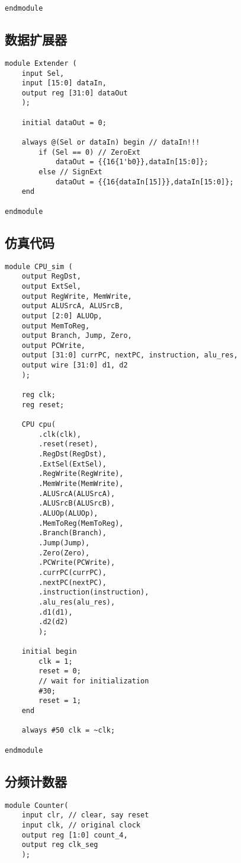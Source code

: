 \begin{multicols}{2}
\begin{lstlisting}
endmodule
\end{lstlisting}

\subsection{数据扩展器}
\begin{lstlisting}
module Extender (
	input Sel,
	input [15:0] dataIn,
	output reg [31:0] dataOut
	);

	initial dataOut = 0;

	always @(Sel or dataIn) begin // dataIn!!!
		if (Sel == 0) // ZeroExt
			dataOut = {{16{1'b0}},dataIn[15:0]};
		else // SignExt
			dataOut = {{16{dataIn[15]}},dataIn[15:0]};
	end

endmodule
\end{lstlisting}

\subsection{仿真代码}
\begin{lstlisting}
module CPU_sim (
	output RegDst,
	output ExtSel,
	output RegWrite, MemWrite,
	output ALUSrcA, ALUSrcB,
	output [2:0] ALUOp,
	output MemToReg,
	output Branch, Jump, Zero,
	output PCWrite,
	output [31:0] currPC, nextPC, instruction, alu_res,
	output wire [31:0] d1, d2
	);
	
	reg clk;
	reg reset;

	CPU cpu(
		.clk(clk),
		.reset(reset),
		.RegDst(RegDst),
		.ExtSel(ExtSel),
		.RegWrite(RegWrite),
		.MemWrite(MemWrite),
		.ALUSrcA(ALUSrcA),
		.ALUSrcB(ALUSrcB),
		.ALUOp(ALUOp),
		.MemToReg(MemToReg),
		.Branch(Branch),
		.Jump(Jump),
		.Zero(Zero),
		.PCWrite(PCWrite),
		.currPC(currPC),
		.nextPC(nextPC),
		.instruction(instruction),
		.alu_res(alu_res),
		.d1(d1),
		.d2(d2)
		);

	initial begin
		clk = 1;
		reset = 0;
		// wait for initialization
		#30;
		reset = 1;
	end

	always #50 clk = ~clk;

endmodule
\end{lstlisting}

\subsection{分频计数器}
\begin{lstlisting}
module Counter(
    input clr, // clear, say reset
    input clk, // original clock
    output reg [1:0] count_4,
    output reg clk_seg
    );
    

\end{lstlisting}
\end{multicols}
